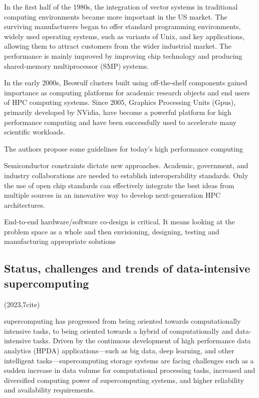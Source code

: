 \documentclass[a4paper,twoside]{scrbook}
\begin{document}
In the first half of the 1980s, the integration of vector systems in traditional computing environments became more important in the US market. The surviving manufacturers began to offer standard programming environments, widely used operating systems, such as variants of Unix, and key applications, allowing them to attract customers from the wider industrial market. The performance is mainly improved by improving chip technology and producing shared-memory multiprocessor (SMP) systems.

In the early 2000s, Beowulf clusters built using off-the-shelf components gained importance as computing platforms for academic research objects and end users of HPC computing systems.
Since 2005, Graphics Processing Units (Gpus), primarily developed by NVidia, have become a powerful platform for high performance computing and have been successfully used to accelerate many scientific workloads.

The authors propose some guidelines for today's high performance computing

Semiconductor constraints dictate new approaches. Academic, government, and industry collaborations are needed to establish interoperability standards. Only the use of open chip standards can effectively integrate the best ideas from multiple sources in an innovative way to develop next-generation HPC architectures.

End-to-end hardware/software co-design is critical. It means looking at the problem space as a whole and then envisioning, designing, testing and manufacturing appropriate solutions


\subsection{Status, challenges and trends of data-intensive supercomputing\cite{wei2022status}}
(2023,7cite)\par

supercomputing has progressed from being oriented towards computationally intensive tasks, to being oriented towards a hybrid of computationally and data-intensive tasks. Driven by the continuous development of high performance data analytics (HPDA) applications—such as big data, deep learning, and other intelligent tasks—supercomputing storage systems are facing challenges such as a sudden increase in data volume for computational processing tasks, increased and diversified computing power of supercomputing systems, and higher reliability and availability requirements.
\end{document}
